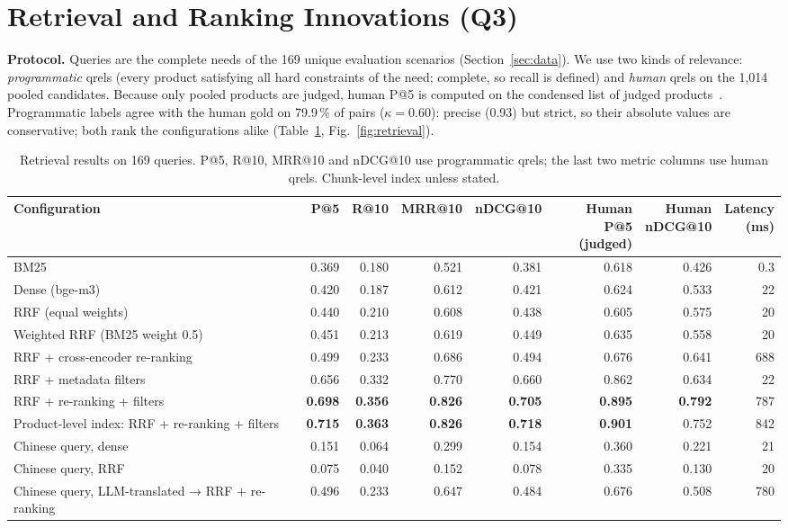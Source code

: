 \documentclass[10pt,a4paper,twocolumn]{article}
\begin{document}
\section{Retrieval and Ranking Innovations (Q3)}
\textbf{Protocol.} Queries are the complete needs of the 169 unique evaluation scenarios (Section~\ref{sec:data}). We use two kinds of relevance: \emph{programmatic} qrels (every product satisfying all hard constraints of the need; complete, so recall is defined) and \emph{human} qrels on the 1,014 pooled candidates. Because only pooled products are judged, human P@5 is computed on the condensed list of judged products~\cite{sakai2007}. Programmatic labels agree with the human gold on 79.9\,\% of pairs ($\kappa{=}0.60$): precise (0.93) but strict, so their absolute values are conservative; both rank the configurations alike (Table~\ref{tab:retrieval}, Fig.~\ref{fig:retrieval}).

\begin{table}[t]
\centering\small
\caption{Retrieval results on 169 queries. P@5, R@10, MRR@10 and nDCG@10 use programmatic qrels; the last two metric columns use human qrels. Chunk-level index unless stated.}
\label{tab:retrieval}
\begin{tabularx}{\textwidth}{@{}X rrrr rr r@{}}
\toprule
Configuration & P@5 & R@10 & MRR@10 & nDCG@10 & \makecell[r]{Human P@5\\(judged)} & \makecell[r]{Human\\nDCG@10} & \makecell[r]{Latency\\(ms)}\\
\midrule
BM25 & 0.369 & 0.180 & 0.521 & 0.381 & 0.618 & 0.426 & 0.3\\
Dense (bge-m3) & 0.420 & 0.187 & 0.612 & 0.421 & 0.624 & 0.533 & 22\\
RRF (equal weights) & 0.440 & 0.210 & 0.608 & 0.438 & 0.605 & 0.575 & 20\\
Weighted RRF (BM25 weight 0.5) & 0.451 & 0.213 & 0.619 & 0.449 & 0.635 & 0.558 & 20\\
RRF + cross-encoder re-ranking & 0.499 & 0.233 & 0.686 & 0.494 & 0.676 & 0.641 & 688\\
RRF + metadata filters & 0.656 & 0.332 & 0.770 & 0.660 & 0.862 & 0.634 & 22\\
RRF + re-ranking + filters & \textbf{0.698} & \textbf{0.356} & \textbf{0.826} & \textbf{0.705} & \textbf{0.895} & \textbf{0.792} & 787\\
\midrule
Product-level index: RRF + re-ranking + filters & \textbf{0.715} & \textbf{0.363} & \textbf{0.826} & \textbf{0.718} & \textbf{0.901} & 0.752 & 842\\
\midrule
Chinese query, dense & 0.151 & 0.064 & 0.299 & 0.154 & 0.360 & 0.221 & 21\\
Chinese query, RRF & 0.075 & 0.040 & 0.152 & 0.078 & 0.335 & 0.130 & 20\\
Chinese query, LLM-translated → RRF + re-ranking & 0.496 & 0.233 & 0.647 & 0.484 & 0.676 & 0.508 & 780\\
\bottomrule
\end{tabularx}
\end{table}
\end{document}
